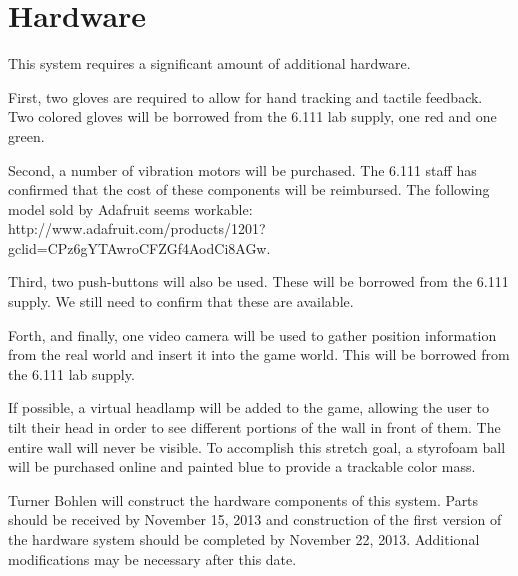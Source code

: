\section{Hardware}
\label{sec:hardware}

This system requires a significant amount of additional hardware.

First, two gloves are required to allow for hand tracking and tactile feedback.
Two colored gloves will be borrowed from the 6.111 lab supply, one red and one
green.

Second, a number of vibration motors will be purchased. The 6.111 staff
has confirmed that the cost of these components will be reimbursed. The
following model sold by Adafruit seems workable: \\
http://www.adafruit.com/products/1201?gclid=CPz6gYTAwroCFZGf4AodCi8AGw.

Third, two push-buttons will also be used. These will be borrowed from the 6.111
supply. We still need to confirm that these are available.

Forth, and finally, one video camera will be used to gather position information
from the real world and insert it into the game world. This will be borrowed
from the 6.111 lab supply.

If possible, a virtual headlamp will be added to the game, allowing the user to
tilt their head in order to see different portions of the wall in front of them.
The entire wall will never be visible. To accomplish this stretch goal, a
styrofoam ball will be purchased online and painted blue to provide a trackable
color mass.

Turner Bohlen will construct the hardware components of this system. Parts
should be received by November 15, 2013 and construction of the first version of
the hardware system should be completed by November 22, 2013. Additional
modifications may be necessary after this date.
